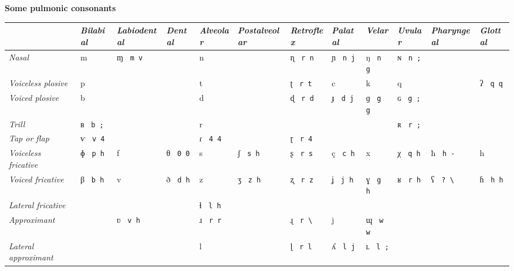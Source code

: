 \documentclass{article}
\newcommand{\seq}[1]{\ \texttt{{\color{purple}#1}}}
\begin{document}
\pagestyle{empty}

\textbf{Some pulmonic consonants}
\vspace{1em}

\begin{tabular}{|llllllllllll|}
  \hline
  & \emph{Bilabial} & \emph{Labiodental} & \emph{Dental} & \emph{Alveolar} & \emph{Postalveolar} & \emph{Retroflex} & \emph{Palatal} & \emph{Velar} & \emph{Uvular} & \emph{Pharyngeal} & \emph{Glottal} \\
  \hline
  \emph{Nasal} & m & ɱ \seq{m v} & & n & & ɳ \seq{r n} & ɲ \seq{n j} & ŋ \seq{n g} & ɴ \seq{n ;} & & \\
  \emph{Voiceless plosive} & p & & & t & & ʈ \seq{r t} & c & k & q & & ʔ \seq{q q} \\
  \emph{Voiced plosive} & b & & & d & & ɖ \seq{r d} & ɟ \seq{d j} & ɡ \seq{g g} & ɢ \seq{g ;} & & \\
  \emph{Trill} & ʙ \seq{b ;} & & & r & & & & & ʀ \seq{r ;} & & \\
  \emph{Tap or flap} & ⱱ \seq{v 4} & & & ɾ \seq{4 4} & & ɽ \seq{r 4} & & & & & \\
  \emph{Voiceless fricative} & ɸ \seq{p h} & f & θ \seq{0 0} & s & ʃ \seq{s h} & ʂ \seq{r s} & ç \seq{c h} & x & χ \seq{q h} & ħ \seq{h -} & h \\
  \emph{Voiced fricative} & β \seq{b h} & v & ð \seq{d h} & z & ʒ \seq{z h} & ʐ \seq{r z} & ʝ \seq{j h} & ɣ \seq{g h} & ʁ \seq{r h} & ʕ \seq{? \textbackslash} & ɦ \seq{h h} \\
  \emph{Lateral fricative} & & & & ɬ \seq{l h} & & & & & & & \\
  \emph{Approximant} & & ʋ \seq{v h} & & ɹ \seq{r r} & & ɻ \seq{r \textbackslash} & j & ɰ \seq{w w} & & & \\
  \emph{Lateral approximant} & & & & l & & ɭ \seq{r l} & ʎ \seq{l j} & ʟ \seq{l ;} & & & \\
  \hline
\end{tabular}
\vspace{1.5em}
\end{document}
